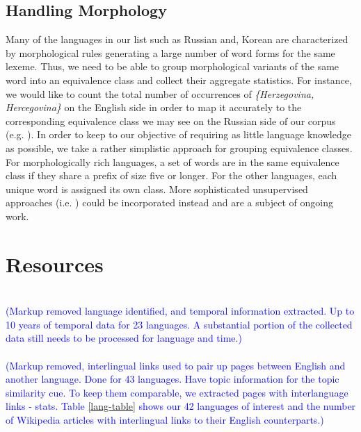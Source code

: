 \documentclass{article}
\newcommand{\todo}[1]{\textcolor{blue}{(#1)}}
\begin{document}
\subsection{Handling Morphology} \label{sect:morph}

Many of the languages in our list such as Russian and, Korean are characterized by morphological rules generating a large 
number of word forms for the same lexeme.  Thus, we need to be able to group morphological variants of the same word into an equivalence class and collect their aggregate statistics.  For instance, we would like to count the total number of occurrences of \emph{\{Herzegovina, Hercegovina\}} on the English side in order to map it accurately to the corresponding equivalence class we may see on the Russian side of our corpus (e.g. ).  In order to keep to our objective of requiring as little language knowledge as possible, we take a rather simplistic approach for grouping equivalence classes.  For morphologically rich languages, a set of words are in the same equivalence class if they share a prefix of size five or longer.  For the other languages, each unique word is assigned its own class.  More sophisticated unsupervised approaches (i.e. \cite{Goldwater:2006}) could be incorporated instead and are a subject of ongoing work.

\section{Resources} \label{sect:resources}

\\ 

\todo{Markup removed language identified, and temporal information extracted. Up to 10 years of temporal data for 23 languages. A substantial portion of the collected data still needs to be processed for language and time.}\\

\\

\todo{Markup removed, interlingual links used to pair up pages between English and another language.  Done for 43 languages.  Have topic information for the topic similarity cue. To keep them comparable, we extracted pages with interlanguage links - stats.  Table \ref{lang-table} shows our 42 languages of interest and the number of Wikipedia articles with interlingual links to their English counterparts.} \\ 
 
\end{document}
